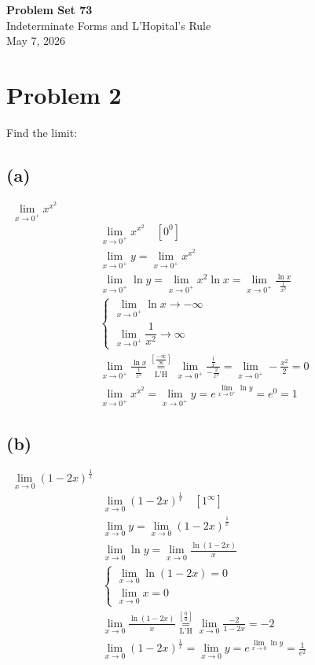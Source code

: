 \documentclass[12pt]{article}
\newcommand*{\lheqzero}{\ensuremath{\underset{\text{L'H}}{\overset{\left[\frac00\right]}{=}}}}
\newcommand{\vem}{\vspace{0.5em}}
\newcommand{\problem}[1]{\section{Problem #1}}
\newcommand{\subproblem}[1]{\subsection{(#1)} \,}
\begin{document}
\vspace*{0cm}

\begin{center}
    {\Large \bfseries Problem Set 73} \\[0.5cm]
    {\large Indeterminate Forms and L'Hopital's Rule} \\[0.35cm]
    {\normalsize May 7, 2026}
\end{center}


\problem{2}
Find the limit: \vem

\subproblem{a} $\lim\limits_{x \to 0^+} x^{x^2}$
\begin{gather*}
    \lim\limits_{x \to 0^+} x^{x^2} \quad [0^0]\\
    \lim_{x \to 0^+}y=\lim_{x \to 0^+}x^{x^2}\\
    \lim_{x \to 0^+}\ln y =\lim_{x \to 0^+}x^2 \ln x=\lim_{x \to 0^+}\frac{\ln x}{\frac{1}{x^2}}\\
    \begin{cases}
        \lim\limits_{x \to 0^+} \ln x \to -\infty\\
        \lim\limits_{x \to 0^+} \dfrac{1}{x^2} \to \infty
    \end{cases}\\
    \lim_{x \to 0^+}\frac{\ln x}{\frac{1}{x^2}} \underset{\text{L'H}}{\overset{\left[\frac{-\infty}{\infty}\right]}{=}}\lim_{x \to 0^+}\frac{\frac{1}{x}}{-\frac{2}{x^3}}=\lim_{x \to 0^+}-\frac{x^2}{2}=0\\
    \lim_{x \to 0^+}x^{x^2}=\lim_{x \to 0^+}y=e^{\lim_{x \to 0^+} \ln y}=e^0=\boxed{1}
\end{gather*}

\subproblem{b} $\lim\limits_{x \to 0}(1-2x)^\frac{1}{x}$
\begin{gather*}
    \lim\limits_{x \to 0}(1-2x)^\frac{1}{x}\quad [1^\infty]\\
    \lim_{x \to 0}y=\lim_{x \to 0}(1-2x)^\frac{1}{x}\\
    \lim_{x \to 0} \ln y =\lim_{x \to 0} \frac{\ln (1-2x)}{x}\\
    \begin{cases}
        \lim\limits_{x \to 0} \ln (1-2x)=0\\
        \lim\limits_{x \to 0}x=0
    \end{cases}\\
    \lim\limits_{x \to 0}\frac{\ln (1-2x)}{x} \lheqzero \lim\limits_{x \to 0} \frac{-2}{1-2x}=-2\\
    \lim\limits_{x \to 0}(1-2x)^\frac{1}{x}=\lim\limits_{x \to 0}y=e^{\lim\limits_{x \to 0}\ln y}=\boxed{\frac{1}{e^2}}
\end{gather*}
\end{document}

